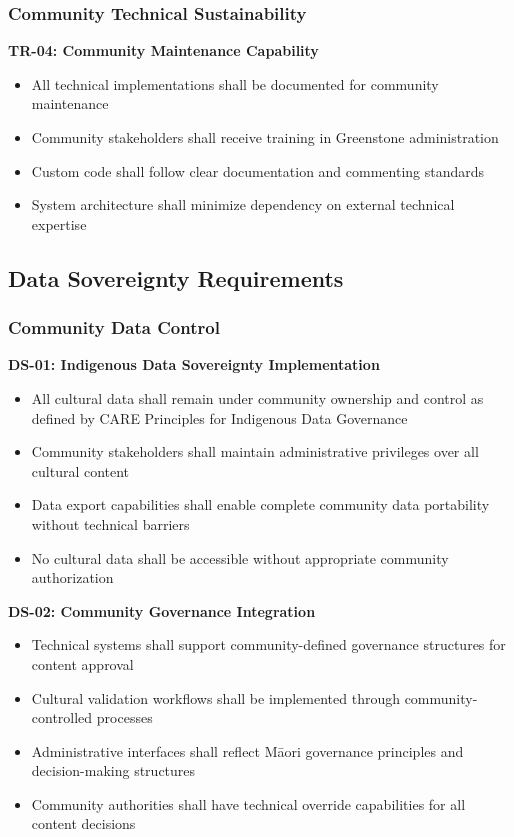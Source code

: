 \subsubsection{Community Technical Sustainability}
\label{subsubsec:technical_sustainability}

\textbf{TR-04: Community Maintenance Capability}
\begin{itemize}
    \item All technical implementations shall be documented for community maintenance
    \item Community stakeholders shall receive training in Greenstone administration
    \item Custom code shall follow clear documentation and commenting standards
    \item System architecture shall minimize dependency on external technical expertise
\end{itemize}

\subsection{Data Sovereignty Requirements}
\label{subsec:data_sovereignty}

\subsubsection{Community Data Control}
\label{subsubsec:community_control}

\textbf{DS-01: Indigenous Data Sovereignty Implementation}
\begin{itemize}
    \item All cultural data shall remain under community ownership and control as defined by CARE Principles for Indigenous Data Governance
    \item Community stakeholders shall maintain administrative privileges over all cultural content
    \item Data export capabilities shall enable complete community data portability without technical barriers
    \item No cultural data shall be accessible without appropriate community authorization
\end{itemize}

\textbf{DS-02: Community Governance Integration}
\begin{itemize}
    \item Technical systems shall support community-defined governance structures for content approval
    \item Cultural validation workflows shall be implemented through community-controlled processes
    \item Administrative interfaces shall reflect M\=aori governance principles and decision-making structures
    \item Community authorities shall have technical override capabilities for all content decisions
\end{itemize}

